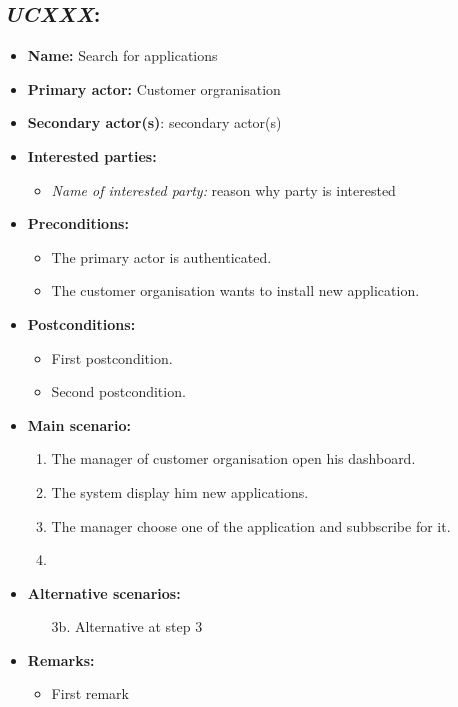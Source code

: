 \subsection{\emph{UCXXX}: }
\begin{itemize}
    \item \textbf{Name:} Search for applications
    \item \textbf{Primary actor:} Customer orgranisation
    \item \textbf{Secondary actor(s)}: secondary actor(s)
    \item \textbf{Interested parties:}
        \begin{itemize}
            \item \textit{Name of interested party:} reason why party is interested
        \end{itemize}

    \item \textbf{Preconditions:}
        \begin{itemize}
            \item The primary actor is authenticated.
            \item The customer organisation wants to install new application.
        \end{itemize}

    \item \textbf{Postconditions:}
        \begin{itemize}
            \item First postcondition.
            \item Second postcondition.
        \end{itemize}

    \item \textbf{Main scenario:}
    \begin{enumerate}
       \item The manager of customer organisation open his dashboard.
       \item The system display him new applications. 
       \item The manager choose one of the application and subbscribe for it.
       \item 
    \end{enumerate}

    \item \textbf{Alternative scenarios:}
    \begin{enumerate}
        \item [3b.] Alternative at step 3
    \end{enumerate}

    \item \textbf{Remarks:}
        \begin{itemize}
            \item First remark
        \end{itemize}
\end{itemize}

